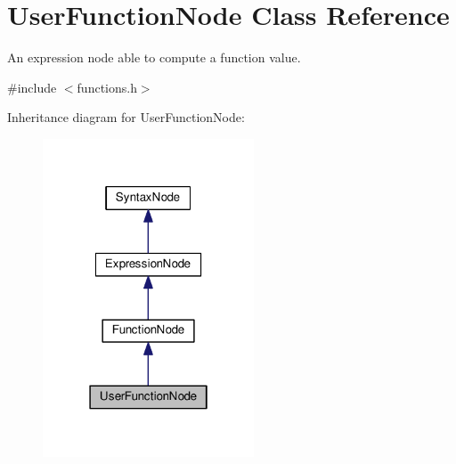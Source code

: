 \hypertarget{classUserFunctionNode}{}\section{User\+Function\+Node Class Reference}
\label{classUserFunctionNode}


An expression node able to compute a function value.  




{\ttfamily \#include $<$functions.\+h$>$}



Inheritance diagram for User\+Function\+Node\+:\nopagebreak
\begin{figure}[H]
\begin{center}
\leavevmode
\includegraphics[width=178pt]{classUserFunctionNode__inherit__graph}
\end{center}
\end{figure}


